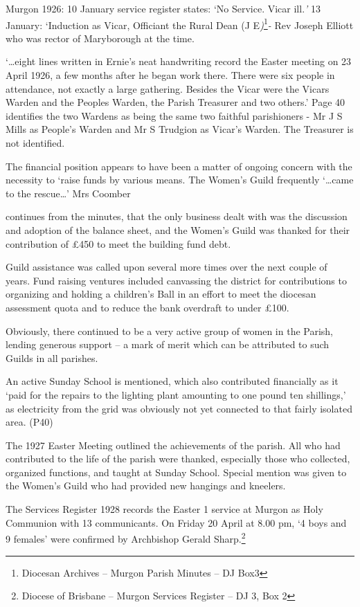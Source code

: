Murgon 1926: 10 January service register states: `No Service. Vicar
ill.\emph{'} 13 January: `Induction as Vicar, Officiant the Rural Dean
(J E\emph{)}\footnote{Diocesan Archives -- Murgon Parish Minutes -- DJ
  Box3}\emph{-} Rev Joseph Elliott who was rector of Maryborough at the
time.

`\ldots eight lines written in Ernie's neat handwriting record the
Easter meeting on 23 April 1926, a few months after he began work there.
There were six people in attendance, not exactly a large gathering.
Besides the Vicar were the Vicars Warden and the Peoples Warden, the
Parish Treasurer and two others.' Page 40 identifies the two Wardens as
being the same two faithful parishioners - Mr J S Mills as People's
Warden and Mr S Trudgion as Vicar's Warden. The Treasurer is not
identified.

The financial position appears to have been a matter of ongoing concern
with the necessity to `raise funds by various means. The Women's Guild
frequently `\ldots came to the rescue\ldots' Mrs Coomber

continues from the minutes, that the only business dealt with was the
discussion and adoption of the balance sheet, and the Women's Guild was
thanked for their contribution of \pounds450 to meet the building fund debt.

Guild assistance was called upon several more times over the next couple
of years. Fund raising ventures included canvassing the district for
contributions to organizing and holding a children's Ball in an effort
to meet the diocesan assessment quota and to reduce the bank overdraft
to under \pounds100.

Obviously, there continued to be a very active group of women in the
Parish, lending generous support -- a mark of merit which can be
attributed to such Guilds in all parishes.

An active Sunday School is mentioned, which also contributed financially
as it `paid for the repairs to the lighting plant amounting to one pound
ten shillings,' as electricity from the grid was obviously not yet
connected to that fairly isolated area. (P40)

The 1927 Easter Meeting outlined the achievements of the parish. All who
had contributed to the life of the parish were thanked, especially those
who collected, organized functions, and taught at Sunday School. Special
mention was given to the Women's Guild who had provided new hangings and
kneelers.

The Services Register 1928 records the Easter 1 service at Murgon as
Holy Communion with 13 communicants. On Friday 20 April at 8.00 pm, `4
boys and 9 females' were confirmed by Archbishop Gerald
Sharp.\footnote{Diocese of Brisbane -- Murgon Services Register -- DJ 3,
  Box 2}


